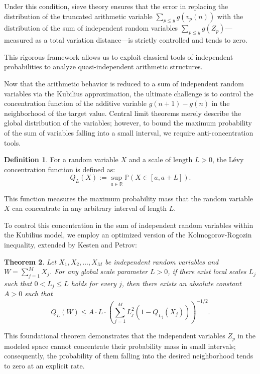 \documentclass[12pt, a4paper]{article}
\theoremstyle{plain}
\newtheorem{theorem}{Theorem}[section]
\theoremstyle{definition}
\newtheorem{definition}[theorem]{Definition}
\begin{document}
Under this condition, sieve theory ensures that the error in replacing the distribution of the truncated arithmetic variable $\sum_{p \leq y} g(v_p(n))$ with the distribution of the sum of independent random variables $\sum_{p \leq y} g(Z_p)$---measured as a total variation distance---is strictly controlled and tends to zero.

This rigorous framework allows us to exploit classical tools of independent probabilities to analyze quasi-independent arithmetic structures.

Now that the arithmetic behavior is reduced to a sum of independent random variables via the Kubilius approximation, the ultimate challenge is to control the concentration function of the additive variable $g(n + 1) - g(n)$ in the neighborhood of the target value. Central limit theorems merely describe the global distribution of the variables; however, to bound the maximum probability of the sum of variables falling into a small interval, we require anti-concentration tools.

\begin{definition}
For a random variable $X$ and a scale of length $L > 0$, the Lévy concentration function is defined as:
\[ Q_L(X) := \sup_{a \in \mathbb{R}} \mathbb{P}(X \in [a, a + L]). \]
\end{definition}
This function measures the maximum probability mass that the random variable $X$ can concentrate in any arbitrary interval of length $L$.

To control this concentration in the sum of independent random variables within the Kubilius model, we employ an optimized version of the Kolmogorov-Rogozin inequality, extended by Kesten and Petrov:

\begin{theorem}
Let $X_1, X_2, \dots, X_M$ be independent random variables and $W = \sum_{j=1}^M X_j$. For any global scale parameter $L > 0$, if there exist local scales $L_j$ such that $0 < L_j \leq L$ holds for every $j$, then there exists an absolute constant $A > 0$ such that
\[ Q_L(W) \leq A \cdot L \cdot \left( \sum_{j=1}^M L_j^2 \left(1 - Q_{L_j}(X_j)\right) \right)^{-1/2}. \]
\end{theorem}

This foundational theorem demonstrates that the independent variables $Z_p$ in the modeled space cannot concentrate their probability mass in small intervals; consequently, the probability of them falling into the desired neighborhood tends to zero at an explicit rate.
\end{document}
